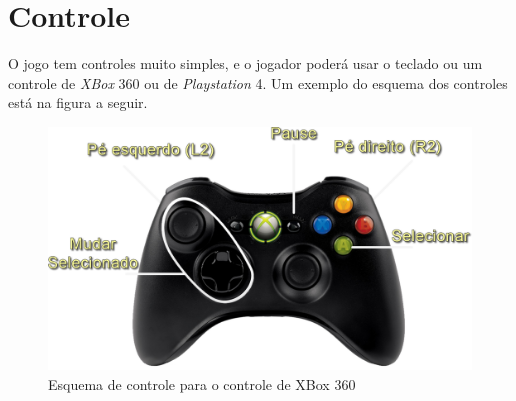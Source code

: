 \section{Controle} 

O jogo tem controles muito simples, e o jogador poderá usar o teclado ou um controle de \textit{XBox} 360 ou de \textit{Playstation} 4. Um exemplo do esquema dos controles está na figura a seguir.

\begin{figure}[H]
\centering\includegraphics[scale=0.2]{figuras/controle.png}
\caption{Esquema de controle para o controle de XBox 360}
\end{figure}
